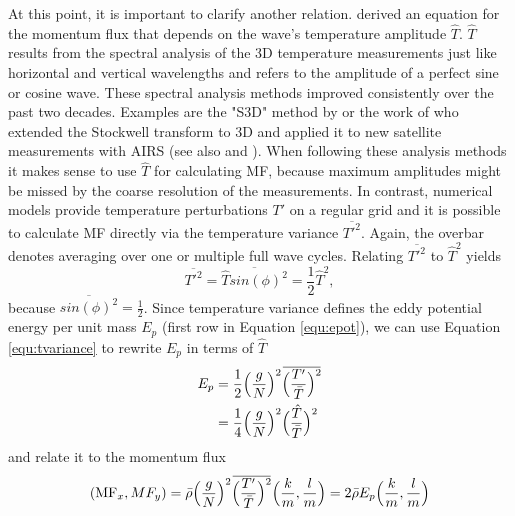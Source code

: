 At this point, it is important to clarify another relation. \textcite[]{ern_absolute_2004} derived an equation for the momentum flux that depends on the wave's temperature amplitude $\hat{T}$. $\hat{T}$ results from the spectral analysis of the 3D temperature measurements just like horizontal and vertical wavelengths and refers to the amplitude of a perfect sine or cosine wave. These spectral analysis methods improved consistently over the past two decades. Examples are the "S3D" method by \textcite[]{lehmann_consistency_2012} or the work of \textcite[]{wright_exploring_2017} who extended the Stockwell transform to 3D and applied it to new satellite measurements with AIRS (see also \cite[]{hindley_gravity_2019} and \cite[]{hindley_18year_2020}). When following these analysis methods it makes sense to use $\hat{T}$ for calculating MF, because maximum amplitudes might be missed by the coarse resolution of the measurements. In contrast, numerical models provide temperature perturbations $T'$ on a regular grid and it is possible to calculate MF directly via the temperature variance $\overbar{T'^2}$. Again, the overbar denotes averaging over one or multiple full wave cycles. Relating $\overbar{T'^2}$ to $\hat{T}^2$ yields
\begin{equation}
    \overbar{T'^2} = \overbar{\hat{T} sin(\phi)^2} = \frac{1}{2}\hat{T}^2,
    \label{equ:tvariance}
\end{equation}
because $\overbar{sin(\phi)^2} = \frac{1}{2}$. Since temperature variance defines the eddy potential energy per unit mass $E_p$ (first row in Equation \ref{equ:epot}), we can use Equation \ref{equ:tvariance} to rewrite $E_p$ in terms of $\hat{T}$
\begin{equation}
    \begin{split}
        E_p &= \frac{1}{2} \Bigl(\frac{g}{N}\Bigr)^2 \overbar{\Bigl(\frac{T'}{\bar{T}}\Bigr)^2} \\
            &= \frac{1}{4} \Bigl(\frac{g}{N}\Bigr)^2 \Bigl(\frac{\hat{T}}{\bar{T}}\Bigr)^2
    \end{split}
    \label{equ:epot}
\end{equation}
and relate it to the momentum flux
\begin{equation}
    (\mathrm{MF}_x, MF_y) = \bar{\rho} \Bigl(\frac{g}{N}\Bigr)^2 \overbar{\Bigl(\frac{T'}{\bar{T}}\Bigr)^2} \Bigl(\frac{k}{m},\frac{l}{m}\Bigr) = 2 \bar{\rho} E_p \Bigl(\frac{k}{m},\frac{l}{m}\Bigr)
    \label{equ:mf-epot}
\end{equation}
